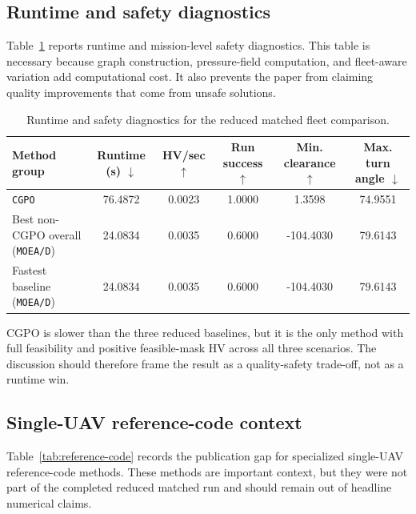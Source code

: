 \subsection{Runtime and safety diagnostics}
\label{subsec:runtime-safety}

Table~\ref{tab:runtime-safety} reports runtime and mission-level safety diagnostics. This table is necessary because graph construction, pressure-field computation, and fleet-aware variation add computational cost. It also prevents the paper from claiming quality improvements that come from unsafe solutions.

\begin{table}[t]
\centering
\caption{Runtime and safety diagnostics for the reduced matched fleet comparison.}
\label{tab:runtime-safety}
\small
\setlength{\tabcolsep}{4pt}
\begin{tabular*}{\textwidth}{@{\extracolsep{\fill}}lccccc}
\toprule
Method group & Runtime (s) $\downarrow$ & HV/sec $\uparrow$ & Run success $\uparrow$ & Min. clearance $\uparrow$ & Max. turn angle $\downarrow$ \\
\midrule
\texttt{CGPO} & 76.4872 & 0.0023 & 1.0000 & 1.3598 & 74.9551 \\
Best non-CGPO overall (\texttt{MOEA/D}) & 24.0834 & 0.0035 & 0.6000 & -104.4030 & 79.6143 \\
Fastest baseline (\texttt{MOEA/D}) & 24.0834 & 0.0035 & 0.6000 & -104.4030 & 79.6143 \\
\bottomrule
\end{tabular*}
\end{table}

CGPO is slower than the three reduced baselines, but it is the only method with full feasibility and positive feasible-mask HV across all three scenarios. The discussion should therefore frame the result as a quality-safety trade-off, not as a runtime win.

\subsection{Single-UAV reference-code context}
\label{subsec:reference-code}

Table~\ref{tab:reference-code} records the publication gap for specialized single-UAV reference-code methods. These methods are important context, but they were not part of the completed reduced matched run and should remain out of headline numerical claims.

